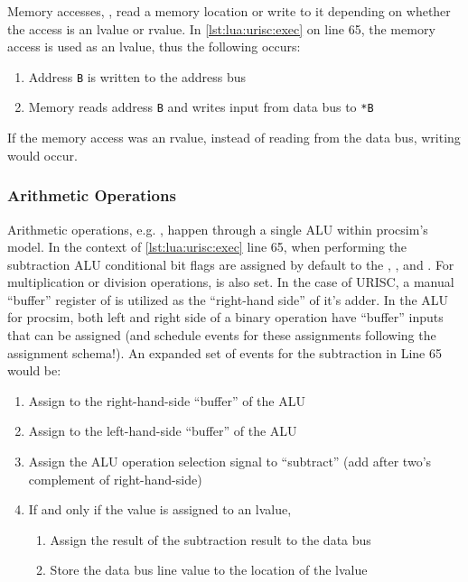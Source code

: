 Memory accesses, , read a memory location or write to it depending on whether the access is an lvalue or rvalue. In \cref{lst:lua:urisc:exec} on line 65, the memory access is used as an lvalue, thus the following occurs:
\begin{enumerate}
    \item Address \texttt{B} is written to the address bus
    \item Memory reads address \texttt{B} and writes input from data bus to \texttt{*B}
\end{enumerate}
If the memory access was an rvalue, instead of reading from the data bus, writing would occur. 
    
\subsubsection*{Arithmetic Operations}

Arithmetic operations, e.g. , happen through a single ALU within procsim's model. In the context of \cref{lst:lua:urisc:exec} line 65, when performing the subtraction ALU conditional bit flags are assigned by default to the , , and . For multiplication or division operations,  is also set. In the case of URISC, a manual ``buffer'' register of  is utilized as the ``right-hand side'' of it's adder. In the ALU for procsim, both left and right side of a binary operation have ``buffer'' inputs that can be assigned (and schedule events for these assignments following the assignment schema!). An expanded set of events for the subtraction in Line 65 would be: 
\begin{spacing}{1.5}
    \begin{enumerate}
        \item Assign  to the right-hand-side ``buffer'' of the ALU
        \item Assign  to the left-hand-side ``buffer'' of the ALU
        \item Assign the ALU operation selection signal to ``subtract'' (add after two's complement of right-hand-side)
        \item If and only if the value is assigned to an lvalue,
        \begin{enumerate}
            \item Assign the result of the subtraction result to the data bus
            \item Store the data bus line value to the location of the lvalue
        \end{enumerate}
    \end{enumerate}
\end{spacing}

